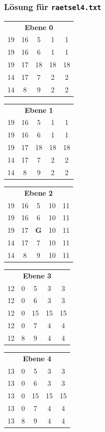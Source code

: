 \documentclass[11pt,a4paper,parskip=half]{scrartcl}
\newcommand{\gold}{\cellcolor{goldcol}\textbf{G}}
\newcommand{\file}[1]{\texttt{#1}}
\begin{document}
\subsubsection*{Lösung für \file{raetsel4.txt}}

\begin{center}\footnotesize\setlength{\tabcolsep}{3pt}
\begin{tabular}[t]{@{}ccccc@{}}
\multicolumn{5}{c}{\textbf{Ebene 0}}\\
19 & 16 & 5 & 1 & 1\\
19 & 16 & 6 & 1 & 1\\
19 & 17 & 18 & 18 & 18\\
14 & 17 & 7 & 2 & 2\\
14 & 8 & 9 & 2 & 2\\
\end{tabular}\hspace{0.9em}
\begin{tabular}[t]{@{}ccccc@{}}
\multicolumn{5}{c}{\textbf{Ebene 1}}\\
19 & 16 & 5 & 1 & 1\\
19 & 16 & 6 & 1 & 1\\
19 & 17 & 18 & 18 & 18\\
14 & 17 & 7 & 2 & 2\\
14 & 8 & 9 & 2 & 2\\
\end{tabular}\hspace{0.9em}
\begin{tabular}[t]{@{}ccccc@{}}
\multicolumn{5}{c}{\textbf{Ebene 2}}\\
19 & 16 & 5 & 10 & 11\\
19 & 16 & 6 & 10 & 11\\
19 & 17 & \gold & 10 & 11\\
14 & 17 & 7 & 10 & 11\\
14 & 8 & 9 & 10 & 11\\
\end{tabular}\hspace{0.9em}
\begin{tabular}[t]{@{}ccccc@{}}
\multicolumn{5}{c}{\textbf{Ebene 3}}\\
12 & 0 & 5 & 3 & 3\\
12 & 0 & 6 & 3 & 3\\
12 & 0 & 15 & 15 & 15\\
12 & 0 & 7 & 4 & 4\\
12 & 8 & 9 & 4 & 4\\
\end{tabular}\hspace{0.9em}
\begin{tabular}[t]{@{}ccccc@{}}
\multicolumn{5}{c}{\textbf{Ebene 4}}\\
13 & 0 & 5 & 3 & 3\\
13 & 0 & 6 & 3 & 3\\
13 & 0 & 15 & 15 & 15\\
13 & 0 & 7 & 4 & 4\\
13 & 8 & 9 & 4 & 4\\
\end{tabular}\hspace{0.9em}
\end{center}
\end{document}
